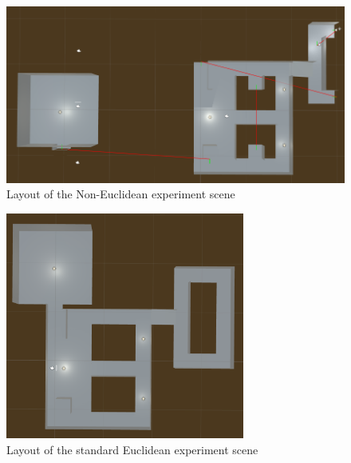 \begin{figure}[h]
	\label{design:fig:design:ne}
	\includegraphics[width=1\textwidth]{Images/NE_Layout}
	\centering
	\caption{Layout of the Non-Euclidean experiment scene}
\end{figure}

\begin{figure}[h]
	\label{design:fig:design:standard}
	\includegraphics[width=0.7\textwidth]{Images/Standard_Layout}
	\centering
	\caption{Layout of the standard Euclidean experiment scene}
\end{figure}

\begin{multicols*}{2}


\end{multicols*}
